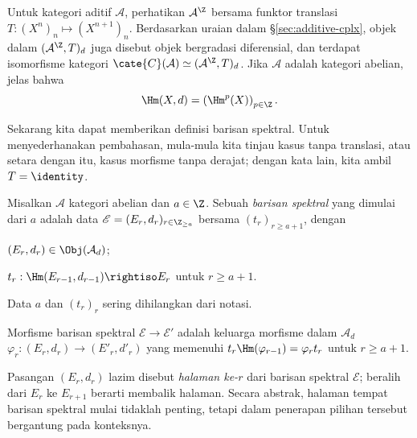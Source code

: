 \begin{example}\label{eg:cplx-as-diff}
	Untuk kategori aditif $\mathcal{A}$, perhatikan $\mathcal{A}^{\Z}$ bersama
	funktor translasi $T:(X^n)_n\mapsto(X^{n+1})_n$. Berdasarkan uraian dalam
	\S\ref{sec:additive-cplx}, objek dalam $(\mathcal{A}^{\Z},T)_d$ juga
	disebut objek bergradasi diferensial, dan terdapat isomorfisme kategori
	$\cate{C}(\mathcal{A})\simeq(\mathcal{A}^{\Z},T)_d$. Jika $\mathcal{A}$
	adalah kategori abelian, jelas bahwa
	\[ \Hm(X,d)=\left(\Hm^p(X)\right)_{p\in\Z}. \]
\end{example}

Sekarang kita dapat memberikan definisi barisan spektral. Untuk menyederhanakan
pembahasan, mula-mula kita tinjau kasus tanpa translasi, atau setara dengan itu,
kasus morfisme tanpa derajat; dengan kata lain, kita ambil
$T=\identity$.

\begin{definition}\label{def:SS-abstract}
	Misalkan $\mathcal{A}$ kategori abelian dan $a\in\Z$. Sebuah
	\emph{barisan spektral} yang dimulai dari $a$ adalah data
	$\mathscr{E}=(E_r,d_r)_{r\in\Z_{\geq a}}$ bersama $(t_r)_{r\geq a+1}$,
	dengan
	\begin{compactitem}
		\item $(E_r,d_r)\in\Obj(\mathcal{A}_d)$;
		\item $t_r:\Hm(E_{r-1},d_{r-1})\rightiso E_r$ untuk $r\geq a+1$.
	\end{compactitem}
	Data $a$ dan $(t_r)_r$ sering dihilangkan dari notasi.

	Morfisme barisan spektral $\mathscr{E}\to\mathscr{E}'$ adalah keluarga
	morfisme dalam $\mathcal{A}_d$
	$\varphi_r:(E_r,d_r)\to(E'_r,d'_r)$ yang memenuhi
	$t_r\Hm(\varphi_{r-1})=\varphi_rt_r$ untuk $r\geq a+1$.
\end{definition}

Pasangan $(E_r,d_r)$ lazim disebut \emph{halaman ke-$r$} dari barisan spektral
$\mathscr{E}$; beralih dari $E_r$ ke $E_{r+1}$ berarti membalik halaman.
Secara abstrak, halaman tempat barisan spektral mulai tidaklah penting, tetapi
dalam penerapan pilihan tersebut bergantung pada konteksnya.

